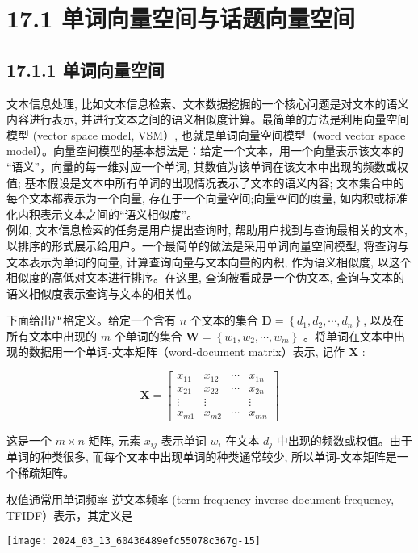 \documentclass[10pt]{article}
\begin{document}
\section*{17.1 单词向量空间与话题向量空间}
\subsection*{17.1.1 单词向量空间}
文本信息处理, 比如文本信息检索、文本数据挖掘的一个核心问题是对文本的语义内容进行表示, 并进行文本之间的语义相似度计算。最简单的方法是利用向量空间模型 (vector space model, VSM）, 也就是单词向量空间模型（word vector space model）。向量空间模型的基本想法是：给定一个文本，用一个向量表示该文本的 “语义”，向量的每一维对应一个单词, 其数值为该单词在该文本中出现的频数或权值; 基本假设是文本中所有单词的出现情况表示了文本的语义内容; 文本集合中的每个文本都表示为一个向量, 存在于一个向量空间;向量空间的度量, 如内积或标准化内积表示文本之间的“语义相似度”。\\
例如, 文本信息检索的任务是用户提出查询时, 帮助用户找到与查询最相关的文本, 以排序的形式展示给用户。一个最简单的做法是采用单词向量空间模型, 将查询与文本表示为单词的向量, 计算查询向量与文本向量的内积, 作为语义相似度, 以这个相似度的高低对文本进行排序。在这里, 查询被看成是一个伪文本, 查询与文本的语义相似度表示查询与文本的相关性。

下面给出严格定义。给定一个含有 $n$ 个文本的集合 $\boldsymbol{D}=\left\{d_{1}, d_{2}, \cdots, d_{n}\right\}$, 以及在所有文本中出现的 $m$ 个单词的集合 $\boldsymbol{W}=\left\{w_{1}, w_{2}, \cdots, w_{m}\right\}$ 。将单词在文本中出现的数据用一个单词-文本矩阵（word-document matrix）表示, 记作 $\boldsymbol{X}$ :

\[
\boldsymbol{X}=\left[\begin{array}{cccc}
x_{11} & x_{12} & \cdots & x_{1 n}  \tag{17.1}\\
x_{21} & x_{22} & \cdots & x_{2 n} \\
\vdots & \vdots & & \vdots \\
x_{m 1} & x_{m 2} & \cdots & x_{m n}
\end{array}\right]
\]

这是一个 $m \times n$ 矩阵, 元素 $x_{i j}$ 表示单词 $w_{i}$ 在文本 $d_{j}$ 中出现的频数或权值。由于单词的种类很多, 而每个文本中出现单词的种类通常较少, 所以单词-文本矩阵是一个稀疏矩阵。

权值通常用单词频率-逆文本频率 (term frequency-inverse document frequency, TFIDF）表示，其定义是

\begin{center}
\texttt{[image: 2024\_03\_13\_60436489efc55078c367g-15]}
\end{center}
\end{document}

